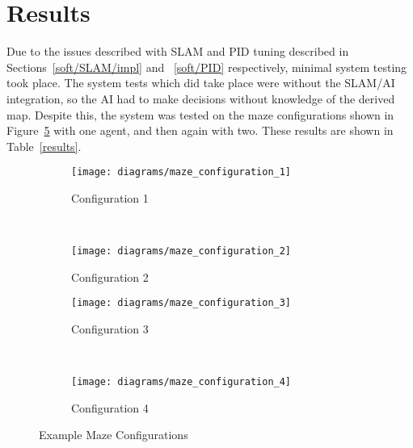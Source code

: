 \section{Results}\label{systest/results}
Due to the issues described with SLAM and PID tuning described in Sections~\ref{soft/SLAM/impl} and ~\ref{soft/PID} respectively, 
minimal system testing took place. The system tests which did take place were 
without the SLAM/AI integration, so the AI had to make decisions without knowledge of the derived map. Despite this, the 
system was tested on the maze configurations shown in Figure~\ref{fig:maze_configs} with one agent, and then again with two. These results are shown in Table~\ref{results}. 

\begin{figure}[!ht]
  \centering
  \begin{subfigure}[b]{0.3\textwidth}
    \texttt{[image: diagrams/maze\_configuration\_1]}
    \caption{Configuration 1}
    \label{fig:maze_configs/1}
  \end{subfigure}
  ~
  \begin{subfigure}[b]{0.3\textwidth}
    \texttt{[image: diagrams/maze\_configuration\_2]}
    \caption{Configuration 2}
    \label{fig:maze_configs/2}
  \end{subfigure}

  \begin{subfigure}[b]{0.3\textwidth}
    \texttt{[image: diagrams/maze\_configuration\_3]}
    \caption{Configuration 3}
    \label{fig:maze_configs/3}
  \end{subfigure}
  ~
  \begin{subfigure}[b]{0.3\textwidth}
    \texttt{[image: diagrams/maze\_configuration\_4]}
    \caption{Configuration 4}
    \label{fig:maze_configs/4}
  \end{subfigure}
  \caption{Example Maze Configurations}\label{fig:maze_configs}
\end{figure}


